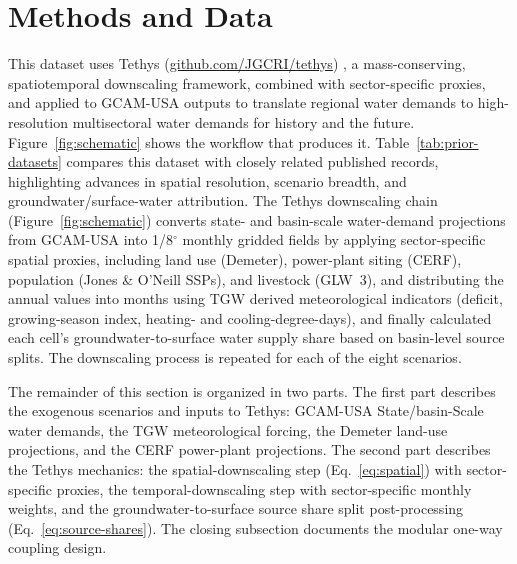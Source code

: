 \documentclass[fleqn,10pt]{wlscirep}
\begin{document}
\section*{Methods and Data}
This dataset uses Tethys (\href{https://github.com/JGCRI/tethys}{github.com/JGCRI/tethys}) \cite{niazi_2026_20552731}, a mass-conserving, spatiotemporal downscaling framework, combined with sector-specific proxies, and applied to GCAM-USA outputs to translate regional water demands to high-resolution multisectoral water demands for history and the future. 
Figure~\ref{fig:schematic} shows the workflow that produces it. Table~\ref{tab:prior-datasets} compares this dataset with closely related published records, highlighting advances in spatial resolution, scenario breadth, and groundwater/surface-water attribution. The Tethys downscaling chain (Figure~\ref{fig:schematic}) converts state- and basin-scale water-demand projections from GCAM-USA\cite{Zhao_gcamusa_water,Zhao2024,Calvin2019GCAM,Binsted_2022} into 1/8$^{\circ}$ monthly gridded fields by applying sector-specific spatial proxies, including land use (Demeter\cite{Vernon-2018}), power-plant siting (CERF\cite{Zhao2024,Mongird2025CERF}), population (Jones \& O'Neill SSPs\cite{Jones_2016}), and livestock (GLW~3\cite{Gilbert2018}), and distributing the annual values into months using 
TGW\cite{Jones2023TGW} derived meteorological indicators (deficit, growing-season index, heating- and cooling-degree-days), and finally calculated each cell's groundwater-to-surface water supply share based on basin-level source splits. The downscaling process is repeated for each of the eight scenarios. 

The remainder of this section is organized in two parts. The first part describes the exogenous scenarios and inputs to Tethys: GCAM-USA State/basin-Scale water demands, the TGW meteorological forcing, the Demeter land-use projections, and the CERF power-plant projections. The second part describes the Tethys mechanics: the spatial-downscaling step (Eq.~\ref{eq:spatial}) with sector-specific proxies, the temporal-downscaling step with sector-specific monthly weights, and the groundwater-to-surface source share split post-processing (Eq.~\ref{eq:source-shares}). The closing subsection documents the modular one-way coupling design.
\end{document}
